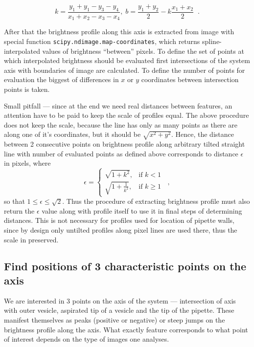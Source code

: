\begin{equation}
k = \frac{y_1+y_1-y_3-y_4}{x_1+x_2-x_3-x_4}, \; b = \frac{y_1+y_2}{2} - k\frac{x_1+x_2}{2}\;\;.
\label{eq:axis}
\end{equation}

After that the brightness profile along this axis is extracted from image with special function \texttt{scipy.ndimage.map-coordinates}, which returns spline-interpolated values of brightness ``between'' pixels. To define the set of points at which interpolated brightness should be evaluated first intersections of the system axis with boundaries of image are calculated. To define the number of points for evaluation the biggest of differences in $x$ or $y$ coordinates between intersection points is taken.

Small pitfall --- since at the end we need real distances between features, an attention have to be paid to keep the scale of profiles equal. The above procedure does not keep the scale, because the line has only as many points as there are along one of it's coordinates, but it should be $\sqrt{x^2+y^2}$. Hence, the distance between 2 consecutive points on brightness profile along arbitrary tilted straight line with number of evaluated points as defined above corresponds to distance $\epsilon$ in pixels, where
\begin{equation}
\epsilon = \left\{
\begin{array}{ll}
	\sqrt{1+k^2},&\text{if }k < 1\\
	\sqrt{1+\frac{1}{k^2}},&\text{if } k \geq 1 
\end{array}
\right.\;\;,
\label{eq:profilescale}
\end{equation}
so that $1 \leq \epsilon \leq \sqrt{2}$. Thus the procedure of extracting brightness profile must also return the $\epsilon$ value along with profile itself to use it in final steps of determining distances. This is not necessary for profiles used for location of pipette walls, since by design only untilted profiles along pixel lines are used there, thus the scale in preserved.

\subsection{Find positions of 3 characteristic points on the axis}\label{points}

We are interested in 3 points on the axis of the system --- intersection of axis with outer vesicle, aspirated tip of a vesicle and the tip of the pipette. These manifest themselves as peaks (positive or negative) or steep jumps on the brightness profile along the axis. What exactly feature corresponds to what point of interest depends on the type of images one analyses.

